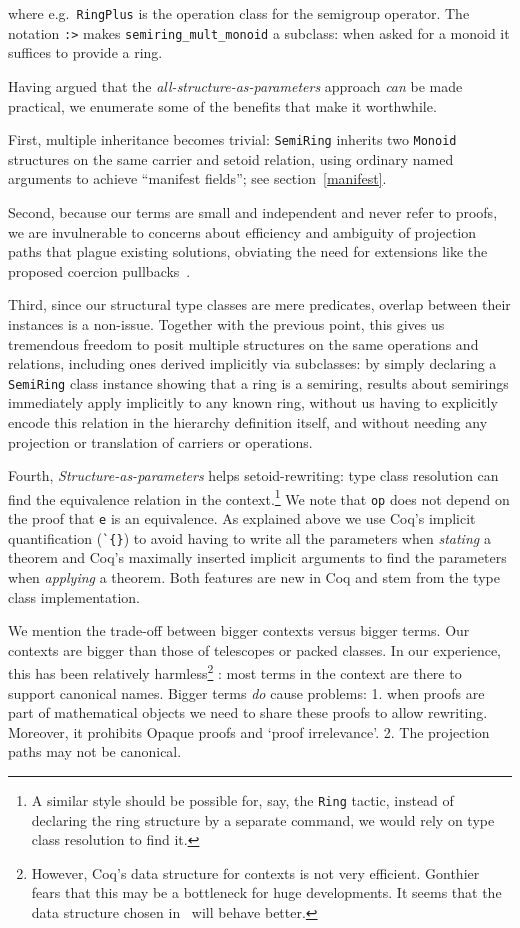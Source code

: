 \documentclass[a4paper,10pt,runningheads]{llncs}
\begin{document}
where e.g.\ \lstinline|RingPlus| is the operation class for the semigroup operator.
The notation \lstinline|:>| makes \lstinline|semiring_mult_monoid| a subclass: when asked for a monoid it suffices to
provide a ring.

Having argued that the \emph{all-structure-as-parameters} approach \emph{can} be made practical, we enumerate some of the benefits that make it worthwhile.

First, multiple inheritance becomes trivial: \lstinline|SemiRing| inherits two \lstinline|Monoid| structures on the same carrier and setoid relation, using ordinary named arguments to achieve ``manifest fields''; see section~\ref{manifest}.

Second, because our terms are small and independent and never refer to proofs, we are invulnerable to concerns about efficiency and ambiguity of projection paths that plague existing solutions, obviating the need for extensions like the proposed coercion pullbacks~\cite{Hints}.

Third, since our structural type classes are mere predicates, overlap between their instances is a non-issue. Together with the previous point, this gives us tremendous freedom to posit multiple structures on the same operations and relations, including ones derived implicitly via subclasses: by simply declaring a \lstinline|SemiRing| class instance showing that a ring is a semiring, results about semirings immediately apply implicitly to any known ring, without us having to explicitly encode this relation in the hierarchy definition itself, and without needing any projection or translation of carriers or operations.

Fourth, \emph{Structure-as-parameters} helps setoid-rewriting: type class resolution
can find the equivalence relation in the context.\footnote{
A similar style should be possible for, say, the \lstinline|Ring| tactic, instead of
declaring the ring structure by a separate command, we would rely on type class resolution to find it.}
We note that \lstinline|op| does not depend on the proof that \lstinline|e| is an equivalence. As explained above we use Coq's implicit quantification (\lstinline|`{}|) to avoid having to write all the parameters when \emph{stating} a theorem and Coq's maximally inserted implicit arguments to find the parameters when \emph{applying} a theorem. Both features are new in Coq and stem from the type class implementation.

We mention the trade-off between bigger contexts versus bigger terms. Our contexts are bigger than
those of telescopes or packed classes. In our experience, this has been relatively
harmless\footnote{However, Coq's data structure for contexts is not very efficient. Gonthier fears that this
may be a bottleneck for huge developments. It seems that the data structure chosen
in~\cite{asperti2009compact} will behave better.}%
: most terms in the context are there to support canonical names. Bigger terms
\emph{do} cause problems: 1. when proofs are part of mathematical objects we need to share these
proofs to allow rewriting. Moreover, it prohibits Opaque proofs and `proof irrelevance'. 2. The
projection paths may not be canonical.
\end{document}
